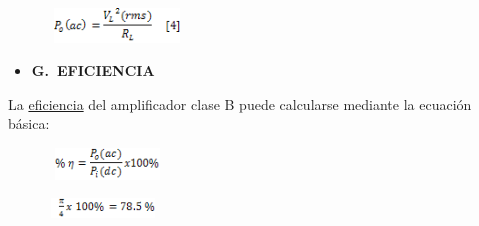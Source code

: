 \documentclass[12pt]{article}
\begin{document}
\begin{figure}[H]
	\begin{Center}
		\includegraphics[width=1.44in,height=0.36in]{./media/image21.gif}
	\end{Center}
\end{figure}



\par

\begin{itemize}
	\item \textbf{G. EFICIENCIA}
\end{itemize}\par

La \href{https://www.monografias.com/trabajos11/veref/veref.shtml}{eficiencia} del amplificador clase B puede calcularse mediante la ecuación básica:\par




\begin{figure}[H]
	\begin{Center}
		\includegraphics[width=1.24in,height=0.33in]{./media/image22.gif}
	\end{Center}
\end{figure}



\par




\begin{figure}[H]
	\begin{Center}
		\includegraphics[width=1.15in,height=0.21in]{./media/image23.gif}
	\end{Center}
\end{figure}
\end{document}
